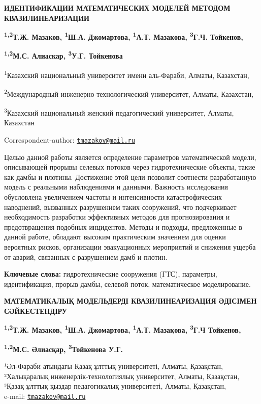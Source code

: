 
{\bfseries ИДЕНТИФИКАЦИИ МАТЕМАТИЧЕСКИХ МОДЕЛЕЙ МЕТОДОМ КВАЗИЛИНЕАРИЗАЦИИ}

{\bfseries \textsuperscript{1,2}Т.Ж. Мазаков\textsuperscript{\envelope },
\textsuperscript{1}Ш.А. Джомартова, \textsuperscript{1}А.Т. Мазакова,
\textsuperscript{3}Г.Ч. Тойкенов,}

{\bfseries \textsuperscript{1,2}М.С. Алиаскар, \textsuperscript{3}У.Г.
Тойкенова}

\textsuperscript{1}Казахский национальный университет имени аль-Фараби,
Алматы, Казахстан,

\textsuperscript{2}Международный инженерно-технологический университет,
Алматы, Казахстан,

\textsuperscript{3}Казахский национальный женский педагогический
университет, Алматы, Казахстан

{\bfseries \textsuperscript{\envelope }}Correspondent-author:
\href{mailto:tmazakov@mail.ru}{\nolinkurl{tmazakov@mail.ru}}

Целью данной работы является определение параметров математической
модели, описывающей прорывы селевых потоков через гидротехнические
объекты, такие как дамбы и плотины. Достижение этой цели позволит
соотнести разработанную модель с реальными наблюдениями и данными.
Важность исследования обусловлена увеличением частоты и интенсивности
катастрофических наводнений, вызванных разрушением таких сооружений, что
подчеркивает необходимость разработки эффективных методов для
прогнозирования и предотвращения подобных инцидентов. Методы и подходы,
предложенные в данной работе, обладают высоким практическим значением
для оценки вероятных рисков, организации эвакуационных мероприятий и
снижения ущерба от аварий, связанных с разрушением дамб и плотин.

{\bfseries Ключевые слова:} гидротехнические сооружения (ГТС), параметры,
идентификация, прорыв дамбы, селевой поток, математическое
моделирование.

{\bfseries МАТЕМАТИКАЛЫҚ МОДЕЛЬДЕРДІ КВАЗИЛИНЕАРИЗАЦИЯ ӘДІСІМЕН
СӘЙКЕСТЕНДІРУ}

{\bfseries \textsuperscript{1,2}Т.Ж. Мазаков\textsuperscript{\envelope },
\textsuperscript{1}Ш.А. Джомартова, \textsuperscript{1}А.Т. Мазақова,
\textsuperscript{3}Г.Ч Тойкенов,}

{\bfseries \textsuperscript{1,2}М.С. Әлиасқар, \textsuperscript{3}Тойкенова
У.Г.}

¹Әл-Фараби атындағы Қазақ ұлттық университеті, Алматы, Қазақстан,\\
²Халықаралық инженерлік-технологиялық университет, Алматы, Қазақстан,\\
³Қазақ ұлттық қыздар педагогикалық университеті, Алматы, Қазақстан,\\
e-mail: \href{mailto:tmazakov@mail.ru}{\nolinkurl{tmazakov@mail.ru}}

